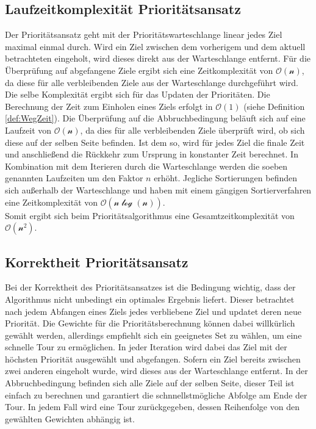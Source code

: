 \documentclass[german,version-2019-11]{uzl-thesis}
\begin{document}
\subsection{Laufzeitkomplexität Prioritätsansatz}

Der Prioritätsansatz geht mit der Prioritätswarteschlange linear jedes Ziel maximal einmal durch. Wird ein Ziel zwischen dem vorherigem und dem aktuell betrachteten eingeholt, wird dieses direkt aus der Warteschlange entfernt. 
Für die Überprüfung auf abgefangene Ziele ergibt sich eine Zeitkomplexität von $\mathcal{O(n)}$, da diese für alle verbleibenden Ziele aus der Warteschlange durchgeführt wird. Die selbe Komplexität ergibt sich für das Updaten der Prioritäten. Die Berechnung der Zeit zum Einholen eines Ziels erfolgt in $\mathcal{O(1)}$ (siehe Definition \ref{def:WegZeit}). Die Überprüfung auf die Abbruchbedingung beläuft sich auf eine Laufzeit von $\mathcal{O(n)}$, da dies für alle verbleibenden Ziele überprüft wird, ob sich diese auf der selben Seite befinden. Ist dem so, wird für jedes Ziel die finale Zeit und anschließend die Rückkehr zum Ursprung in konstanter Zeit berechnet. In Kombination mit dem Iterieren durch die Warteschlange werden die soeben genannten Laufzeiten um den Faktor $n$ erhöht. Jegliche Sortierungen befinden sich außerhalb der Warteschlange und haben mit einem gängigen Sortierverfahren \cite{kaaser2014algorithmen} eine Zeitkomplexität von $\mathcal{O(n\log(n))}$. \\
Somit ergibt sich beim Prioritätsalgorithmus eine Gesamtzeitkomplexität von $\mathcal{O(n^2)}$.

\subsection{Korrektheit Prioritätsansatz}
Bei der Korrektheit des Prioritätsansatzes ist die Bedingung wichtig, dass der Algorithmus nicht unbedingt ein optimales Ergebnis liefert. Dieser betrachtet nach jedem Abfangen eines Ziels jedes verbliebene Ziel und updatet deren neue Priorität. Die Gewichte für die Prioritätsberechnung können dabei willkürlich gewählt werden, allerdings empfiehlt sich ein geeignetes Set zu wählen, um eine schnelle Tour zu ermöglichen. In jeder Iteration wird dabei das Ziel mit der höchsten Priorität ausgewählt und abgefangen. Sofern ein Ziel bereits zwischen zwei anderen eingeholt wurde, wird dieses aus der Warteschlange entfernt. In der Abbruchbedingung befinden sich alle Ziele auf der selben Seite, dieser Teil ist einfach zu berechnen und garantiert die schnnellstmögliche Abfolge am Ende der Tour. In jedem Fall wird eine Tour zurückgegeben, dessen Reihenfolge von den gewählten Gewichten abhängig ist.
\end{document}
